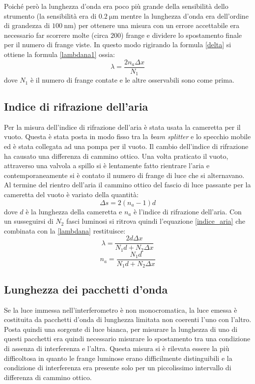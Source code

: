 \documentclass[a4paper,11pt]{article}
\begin{document}
Poiché però la lunghezza d'onda era poco più grande della sensibilità dello strumento (la sensibilità era di $ \SI{0.2}{\micro\meter} $ mentre la lunghezza d'onda era dell'ordine di grandezza di $ \SI{100}{\nano\meter} $) per ottenere una misura con un errore accettabile era necessario far scorrere molte (circa $ \num{200} $) frange e dividere lo spostamento finale per il numero di frange viste. In questo modo rigirando la formula \ref{delta} si ottiene la formula \ref{lambdana1} ossia:
\begin{equation}\label{lambdana}
	\lambda=\dfrac{2n_a\Delta x}{N_1}		
\end{equation}
dove $ N_1 $ è il numero di frange contate e le altre osservabili sono come prima.

\subsection{Indice di rifrazione dell'aria}
Per la misura dell'indice di rifrazione dell'aria è stata usata la cameretta per il vuoto. Questa è stata posta in modo fisso tra la \emph{beam splitter} e lo specchio mobile ed è stata collegata ad una pompa per il vuoto. Il cambio dell'indice di rifrazione ha causato una differenza di cammino ottico. Una volta praticato il vuoto, attraverso una valvola a spillo si è lentamente fatto rientrare l'aria e contemporaneamente si è contato il numero di frange di luce che si alternavano. Al termine del rientro dell'aria il cammino ottico del fascio di luce passante per la cameretta del vuoto è variato della quantità:
\begin{equation}\label{deltavuoto}
	\Delta s = 2(n_a-1)d
\end{equation}
dove $ d $ è la lunghezza della cameretta e $ n_a $ è l'indice di rifrazione dell'aria. Con un susseguirsi di $ N_2 $ fasci luminosi si ritrova quindi l'equazione \ref{indice_aria} che combinata con la \ref{lambdana} restituisce:
\begin{equation}\label{lambda}
	\lambda=\dfrac{2d\Delta x}{N_1 d + N_2 \Delta x}
\end{equation}
\begin{equation}\label{na}
	n_a=\dfrac{N_1 d}{N_1 d + N_2 \Delta x}
\end{equation}

\subsection{Lunghezza dei pacchetti d'onda}
Se la luce immessa nell'interferometro è non monocromatica, la luce emessa è costituita da pacchetti d'onda di lunghezza limitata non coerenti l'uno con l'altro. Posta quindi una sorgente di luce bianca, per misurare la lunghezza di uno di questi pacchetti era quindi necessario misurare lo spostamento tra una condizione di assenza di interferenza e l'altra. Questa misura si è rilevata essere la più difficoltosa in quanto le frange luminose erano difficilmente distinguibili e la condizione di interferenza era presente solo per un piccolissimo intervallo di differenza di cammino ottico.
\end{document}
